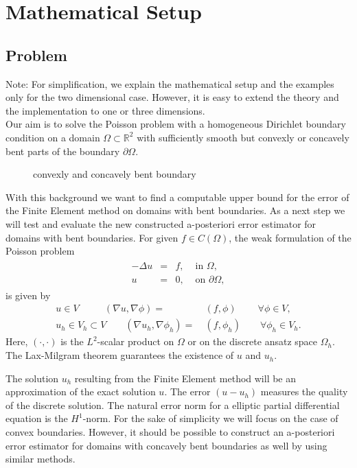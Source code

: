 \documentclass[a4paper, 11pt, twoside]{article}
\begin{document}
\section{Mathematical Setup}
\subsection{Problem}
Note: For simplification, we explain the mathematical setup and the examples only for the two dimensional case. 
However, it is easy to extend the theory and the implementation to one or three dimensions.\\
Our aim is to solve the Poisson problem with a homogeneous Dirichlet boundary condition on a domain $\Omega \subset \mathbb{R}^2$ with sufficiently smooth but convexly or concavely
bent parts of the boundary $\partial \Omega$.
\begin{figure}[!htbp]
\centering
{}
\caption{convexly and concavely bent boundary}
\end{figure}
With this background we want to find a computable upper bound for the error of the Finite Element method on domains with bent boundaries.
As a next step we will test and evaluate the new constructed a-posteriori error estimator for domains with bent boundaries.
For given $f \in C(\Omega)$, the weak formulation of the Poisson problem
\begin{eqnarray}\label{poisson_equation}
\begin{array}{rcll}
-\Delta u &=& f, & \text{ in }\Omega,\\
        u &=& 0, & \text{ on }\partial\Omega,
\end{array}
\end{eqnarray}
is given by
\begin{align*}
 u \in V\qquad\ \ \	(\nabla u,\nabla \phi) =&\ (f,\phi)\ \qquad	\forall \phi \in V,\\
u_h \in V_h \subset V\qquad	(\nabla u_h,\nabla \phi_h) =&\ (f,\phi_h)\qquad	\forall \phi_h \in V_h.
\end{align*}
Here, $(\cdot,\cdot)$ is the $L^2$-scalar product on $\Omega$ or on the discrete ansatz space $\Omega_h$.
The Lax-Milgram theorem guarantees the existence of $u$ and $u_h$.

The solution $u_h$ resulting from the Finite Element method will be an approximation of the exact solution $u$. 
The error $(u-u_h)$ measures the quality of the discrete solution.
The natural error norm for a elliptic partial differential equation is the $H^1$-norm. 
For the sake of simplicity we will focus on the case of convex boundaries. However, 
it should be possible to construct an a-posteriori error estimator for domains with concavely bent boundaries as well by using similar methods. 
\end{document}
